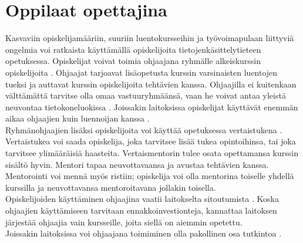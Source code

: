 \documentclass[finnish]{tktltiki2}
\theoremstyle{definition}
\theoremstyle{remark}
\begin{document}
\section{Oppilaat opettajina}
Kasvaviin opiskelijamääriin, suuriin luentokursseihin ja työvoimapulaan liittyviä ongelmia voi ratkaista käyttämällä opiskelijoita tietojenkäsittelytieteen opetuksessa. Opiskelijat voivat toimia ohjaajana ryhmälle alkeiskurssin o\-pis\-ke\-li\-joi\-ta \cite{Reges88}. Ohjaajat tarjoavat lisäopetusta kurssin varsinaisten luentojen tueksi ja auttavat kurssin opiskelijoita tehtävien kanssa. Ohjaajilla ei kuitenkaan välttämättä tarvitse olla omaa vastuuryhmäänsä, vaan he voivat antaa yleistä neuvontaa tietokoneluokissa \cite{Vikberg, Vihavainen}. Joissakin laitoksissa opiskelijat käyttävät enemmän aikaa ohjaajien kuin luennoijan kanssa \cite{Patitsas12_3}.
\\
Ryhmänohjaajien lisäksi opiskelijoita voi käyttää opetuksessa vertaistukena \cite{Tashakkori05}. Vertaistukea voi saada opiskelija, joka tarvitsee lisää tukea opintoihinsa, tai joka tarvitsee ylimääräisiä haasteita. Vertaismentorin tulee osata opettamansa  kurssin sisältö hyvin. Mentori tapaa neuvottavaansa ja avustaa tehtävien kanssa. Mentorointi voi mennä myös ristiin; opiskelija voi olla mentorina toiselle yhdellä kurssilla ja neuvottavansa mentoroitavana jollakin toisella.
\\
Opiskelijoiden käyttäminen ohjaajina vaatii laitokselta sitoutumista \cite{Kopp00}. Koska ohjaajien käyttämiseen tarvitaan ennakkoinvestionteja, kannattaa laitoksen järjestää ohjaajia vain kursseille, joita siellä on aiemmin opetettu. 
\\
Joissakin laitoksissa voi ohjaajana toimiminen olla pakollinen osa tutkintoa \cite{Kay95}.
\end{document}
